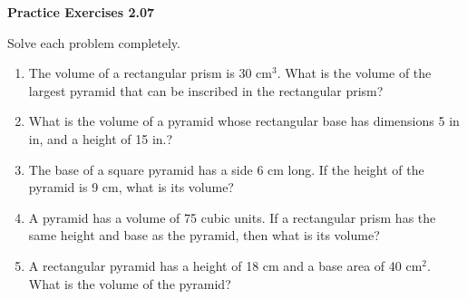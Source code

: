 \vspace{0.3ex}
\noindent\textbf{Practice Exercises 2.07}

\vspace{0.2ex}

Solve each problem completely.
\begin{enumerate}[noitemsep, label = \color{blue}\arabic*. ]
\item The volume of a rectangular prism is 30 cm\(^{3}\). What is the volume of the largest pyramid that can be inscribed in the rectangular prism?
\item What is the volume of a pyramid whose rectangular base has dimensions 5 in  in, and a height of 15 in.?
\item The base of a square pyramid has a side 6 cm long. If the height of the pyramid is 9 cm, what is its volume?
\item A pyramid has a volume of 75 cubic units. If a rectangular prism has the same height and base as the pyramid, then what is its volume?
    \item A rectangular pyramid has a height of 18 cm and a base area of 40 cm\(^{2}\). What is the volume of the pyramid?
 
\end{enumerate}
